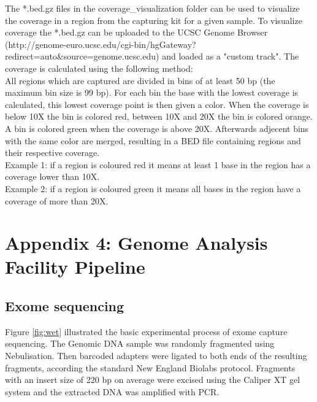 \documentclass[a4paper,12pt]{article}
\begin{document}
The *.bed.gz files in the coverage_visualization folder can be used to visualize the coverage in a region from the capturing kit for a given sample. To visualize coverage the *.bed.gz can be uploaded to the UCSC Genome Browser (http://genome-euro.ucsc.edu/cgi-bin/hgGateway?redirect=auto&source=genome.ucsc.edu) and loaded as a "custom track". The coverage is calculated using the following method:\\
All regions which are captured are divided in bins of at least 50 bp (the maximum bin size is 99 bp). For each bin the base with the lowest coverage is calculated, this lowest coverage point is then given a color. When the coverage is below 10X the bin is colored red, between 10X and 20X the bin is colored orange. A bin is colored green when the coverage is above 20X. Afterwards adjecent bins with the same color are merged, resulting in a BED file containing regions and their respective coverage.\\
Example 1: if a region is coloured red it means at least 1 base in the region has a coverage lower than 10X.\\
Example 2: if a region is coloured green it means all bases in the region have a coverage of more than 20X.

\clearpage
\section*{Appendix 4: Genome Analysis Facility Pipeline}
\subsection*{Exome sequencing}
\begin{wrapfigure}{r}{0.5\textwidth}
	\begin{center}
		\texttt{[image: \$\{gaffig]}}
	\end{center}
	\caption{Workflow in the lab}
	\label{fig:wet}
\end{wrapfigure}
Figure \ref{fig:wet} illustrated the basic experimental process of exome capture sequencing. The Genomic DNA sample was randomly fragmented using Nebulisation. Then barcoded adapters were ligated to both ends of the resulting fragments, according the standard New England Biolabs protocol. Fragments with an insert size of 220 bp on average were excised using the Caliper XT gel system and the extracted DNA was amplified with PCR.
\end{document}

